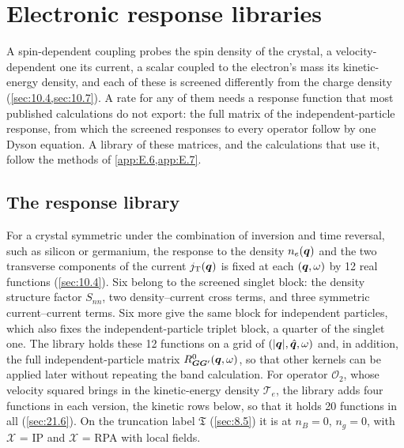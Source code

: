 \section{Electronic response libraries}\label{app:E.16}

A spin-dependent coupling probes the spin density of the crystal, a velocity-dependent one its current, a scalar coupled to the electron's mass its kinetic-energy density, and each of these is screened differently from the charge density (\cref{sec:10.4,sec:10.7}). A rate for any of them needs a response function that most published calculations do not export: the full matrix of the independent-particle response, from which the screened responses to every operator follow by one Dyson equation. A library of these matrices, and the calculations that use it, follow the methods of \cref{app:E.6,app:E.7}.

\subsection{The response library}

For a crystal symmetric under the combination of inversion and time reversal, such as silicon or germanium, the response to the density $n_e(\bm{q})$ and the two transverse components of the current $j_{\mathrm{T}}(\bm{q})$ is fixed at each $(\bm{q},\omega)$ by 12 real functions (\cref{sec:10.4}). Six belong to the screened singlet block: the density structure factor $S_{nn}$, two density--current cross terms, and three symmetric current--current terms. Six more give the same block for independent particles, which also fixes the independent-particle triplet block, a quarter of the singlet one. The library holds these 12 functions on a grid of $(|\bm{q}|,\hat{\bm{q}},\omega)$ and, in addition, the full independent-particle matrix $R^0_{\bm{G}\bm{G}'}(\bm{q},\omega)$, so that other kernels can be applied later without repeating the band calculation. For operator $\mathcal{O}_2$, whose velocity squared brings in the kinetic-energy density $\mathcal{T}_e$, the library adds four functions in each version, the kinetic rows below, so that it holds 20 functions in all (\cref{sec:21.6}). On the truncation label $\mathfrak{T}$ (\cref{sec:8.5}) it is at $n_B = 0$, $n_g = 0$, with $\mathcal{X}$ = IP and $\mathcal{X}$ = RPA with local fields.

